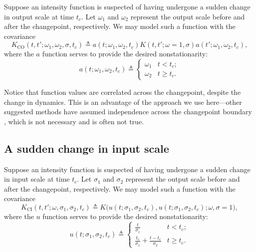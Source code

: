 \documentclass{article}
\newcommand{\deq}{\triangleq}
\begin{document}
Suppose an intensity function is suspected of having undergone a
sudden change in output scale at time $t_c$.  Let $\omega_1$ and
$\omega_2$ represent the output scale before and after the changepoint,
respectively.  We may model such a function with the covariance
\begin{equation*}
  K_{\text{CO}}(t, t'; \omega_1, \omega_2, \sigma, t_c)
  \deq 
  a(t; \omega_1, \omega_2, t_c)
  K(t, t'; \omega = 1, \sigma)
  a(t'; \omega_1, \omega_2, t_c),
\end{equation*}
where the $a$ function serves to provide the desired nonstationarity:
\begin{equation}
  \label{outchange}
  a(t; \omega_1, \omega_2, t_c) 
  \deq
  \begin{cases}
    \omega_1 & t < t_c; \\
    \omega_2 & t \geq t_c.
  \end{cases}
\end{equation}

Notice that function values are correlated across the changepoint,
despite the change in dynamics.  This is an advantage of the approach
we use here---other suggested methods have assumed independence
across the changepoint boundary \citep{adamscp, bocpd}, which is not
necessary and is often not true.

\subsection{A sudden change in input scale}

Suppose an intensity function is suspected of having undergone a
sudden change in input scale at time $t_c$.  Let $\sigma_1$ and
$\sigma_2$ represent the output scale before and after the changepoint,
respectively.  We may model such a function with the covariance
\begin{equation*}
  K_{\text{CI}}(t, t'; \omega, \sigma_1, \sigma_2, t_c)
  \deq 
  K
  \bigl(
    u(t; \sigma_1, \sigma_2, t_c), 
    u(t; \sigma_1, \sigma_2, t_c); 
    \omega, \sigma = 1 
  \bigr),
\end{equation*}
where the $u$ function serves to provide the desired nonstationarity:
\begin{equation}
  \label{inchange}
  u(t; \sigma_1, \sigma_2, t_c) 
  \deq
  \begin{cases}
    \frac{t}{\sigma_1} 
    & t < t_c; \\
    \frac{t_c}{\sigma_1} + \frac{t - t_c}{\sigma_2} 
    & t \geq t_c.
  \end{cases}
\end{equation}
\end{document}
